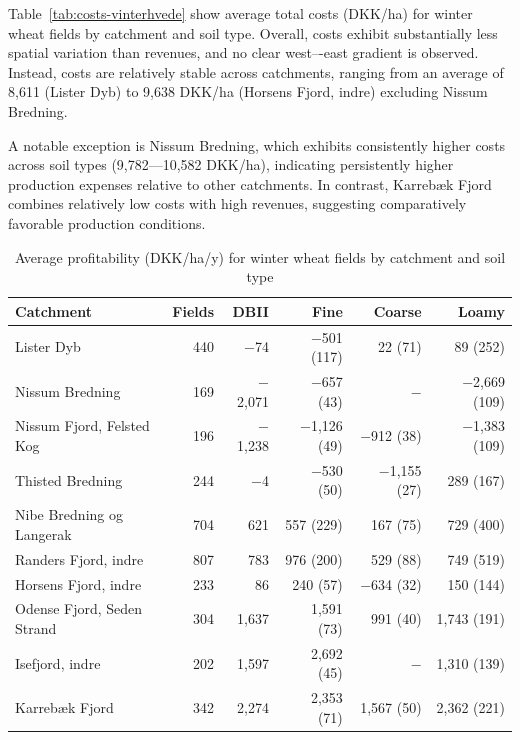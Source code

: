 \documentclass[12pt]{article}
\begin{document}
Table~\ref{tab:costs-vinterhvede} show average total costs (DKK/ha) for winter wheat fields by catchment and soil type. 
Overall, costs exhibit substantially less spatial variation than revenues, and no clear west–-east gradient is observed. 
Instead, costs are relatively stable across catchments, ranging from an average of 8,611 (Lister Dyb) to 9,638 DKK/ha (Horsens Fjord, indre) excluding Nissum Bredning.

A notable exception is Nissum Bredning, which exhibits consistently higher costs across soil types (9,782---10,582 DKK/ha), indicating persistently higher production expenses relative to other catchments. 
In contrast, Karrebæk Fjord combines relatively low costs with high revenues, suggesting comparatively favorable production conditions.


\begin{table}[H]
\centering
\small
\caption{Average profitability (DKK/ha/y) for winter wheat fields by catchment and soil type}
\label{tab:dbii-vinterhvede}
\begin{threeparttable}
\begin{tabular}{lrrrrr}
\toprule
\textbf{Catchment} & \textbf{Fields} & \textbf{DBII} & \textbf{Fine} &
\textbf{Coarse} & \textbf{Loamy} \\
\midrule\addlinespace
Lister Dyb                 & 440 &  $-$74   & $-$501 (117)  &    22 (71)    &    89 (252) \\
Nissum Bredning            & 169 & $-$2,071 & $-$657 (43)   & $-$            & $-$2,669 (109) \\
Nissum Fjord, Felsted Kog  & 196 & $-$1,238 & $-$1,126 (49) & $-$912 (38)   & $-$1,383 (109) \\
Thisted Bredning           & 244 &   $-$4   & $-$530 (50)   & $-$1,155 (27) &    289 (167) \\
Nibe Bredning og Langerak  & 704 &   621    &   557 (229)   &   167 (75)    &    729 (400) \\
Randers Fjord, indre       & 807 &   783    &   976 (200)   &   529 (88)    &    749 (519) \\
Horsens Fjord, indre       & 233 &    86    &   240 (57)    & $-$634 (32)   &    150 (144) \\
Odense Fjord, Seden Strand & 304 & 1,637    & 1,591 (73)    &   991 (40)    & 1,743 (191) \\
Isefjord, indre            & 202 & 1,597    & 2,692 (45)    & $-$            & 1,310 (139) \\
Karrebæk Fjord             & 342 & 2,274    & 2,353 (71)    & 1,567 (50)    & 2,362 (221) \\

\end{tabular}
\end{threeparttable}
\end{table}
\end{document}
